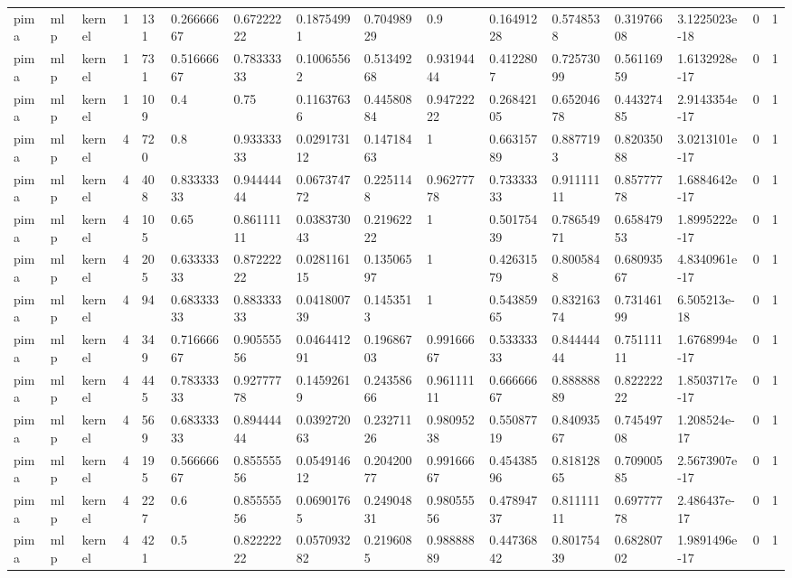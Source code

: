 \begin{tabular}{llllllllllllllll}
pima & mlp & kernel & 1 & 131 & 0.26666667 & 0.67222222 & 0.18754991 & 0.70498929 & 0.9 & 0.16491228 & 0.5748538 & 0.31976608 & 3.1225023e-18 & 0 & 1 \\
pima & mlp & kernel & 1 & 731 & 0.51666667 & 0.78333333 & 0.10065562 & 0.51349268 & 0.93194444 & 0.4122807 & 0.72573099 & 0.56116959 & 1.6132928e-17 & 0 & 1 \\
pima & mlp & kernel & 1 & 109 & 0.4 & 0.75 & 0.11637636 & 0.44580884 & 0.94722222 & 0.26842105 & 0.65204678 & 0.44327485 & 2.9143354e-17 & 0 & 1 \\
pima & mlp & kernel & 4 & 720 & 0.8 & 0.93333333 & 0.029173112 & 0.14718463 & 1 & 0.66315789 & 0.8877193 & 0.82035088 & 3.0213101e-17 & 0 & 1 \\
pima & mlp & kernel & 4 & 408 & 0.83333333 & 0.94444444 & 0.067374772 & 0.2251148 & 0.96277778 & 0.73333333 & 0.91111111 & 0.85777778 & 1.6884642e-17 & 0 & 1 \\
pima & mlp & kernel & 4 & 105 & 0.65 & 0.86111111 & 0.038373043 & 0.21962222 & 1 & 0.50175439 & 0.78654971 & 0.65847953 & 1.8995222e-17 & 0 & 1 \\
pima & mlp & kernel & 4 & 205 & 0.63333333 & 0.87222222 & 0.028116115 & 0.13506597 & 1 & 0.42631579 & 0.8005848 & 0.68093567 & 4.8340961e-17 & 0 & 1 \\
pima & mlp & kernel & 4 & 94 & 0.68333333 & 0.88333333 & 0.041800739 & 0.1453513 & 1 & 0.54385965 & 0.83216374 & 0.73146199 & 6.505213e-18 & 0 & 1 \\
pima & mlp & kernel & 4 & 349 & 0.71666667 & 0.90555556 & 0.046441291 & 0.19686703 & 0.99166667 & 0.53333333 & 0.84444444 & 0.75111111 & 1.6768994e-17 & 0 & 1 \\
pima & mlp & kernel & 4 & 445 & 0.78333333 & 0.92777778 & 0.14592619 & 0.24358666 & 0.96111111 & 0.66666667 & 0.88888889 & 0.82222222 & 1.8503717e-17 & 0 & 1 \\
pima & mlp & kernel & 4 & 569 & 0.68333333 & 0.89444444 & 0.039272063 & 0.23271126 & 0.98095238 & 0.55087719 & 0.84093567 & 0.74549708 & 1.208524e-17 & 0 & 1 \\
pima & mlp & kernel & 4 & 195 & 0.56666667 & 0.85555556 & 0.054914612 & 0.20420077 & 0.99166667 & 0.45438596 & 0.81812865 & 0.70900585 & 2.5673907e-17 & 0 & 1 \\
pima & mlp & kernel & 4 & 227 & 0.6 & 0.85555556 & 0.06901765 & 0.24904831 & 0.98055556 & 0.47894737 & 0.81111111 & 0.69777778 & 2.486437e-17 & 0 & 1 \\
pima & mlp & kernel & 4 & 421 & 0.5 & 0.82222222 & 0.057093282 & 0.2196085 & 0.98888889 & 0.44736842 & 0.80175439 & 0.68280702 & 1.9891496e-17 & 0 & 1 \\

\end{tabular}
